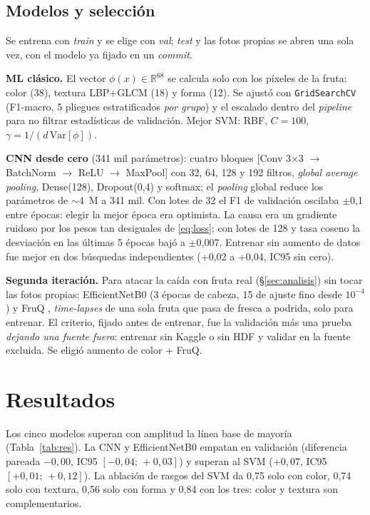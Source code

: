 \documentclass[conference,a4paper]{IEEEtran}
\begin{document}
\subsection{Modelos y selección}

Se entrena con \emph{train} y se elige con \emph{val}; \emph{test} y las fotos propias se abren una sola
vez, con el modelo ya fijado en un \emph{commit}.

\textbf{ML clásico.} El vector $\phi(x)\in\mathbb{R}^{68}$ se calcula solo con los píxeles de la fruta:
color (38), textura LBP+GLCM (18) y forma (12). Se ajustó con \texttt{GridSearchCV} (F1-macro, 5 pliegues
estratificados \emph{por grupo}) y el escalado dentro del \emph{pipeline} para no filtrar estadísticas
de validación. Mejor SVM: RBF, $C=100$, $\gamma=1/(d\,\mathrm{Var}[\phi])$.

\textbf{CNN desde cero} (341 mil parámetros): cuatro bloques [Conv 3$\times$3 $\rightarrow$ BatchNorm
$\rightarrow$ ReLU $\rightarrow$ MaxPool] con 32, 64, 128 y 192 filtros, \emph{global average pooling},
Dense(128), Dropout(0,4) y softmax; el \emph{pooling} global reduce los parámetros de $\sim$4~M a 341
mil. Con lotes de 32 el F1 de validación oscilaba $\pm$0,1 entre épocas: elegir la mejor época era
optimista. La causa era un gradiente ruidoso por los pesos tan desiguales de \eqref{eq:loss}; con
lotes de 128 y tasa coseno la desviación en las últimas 5 épocas bajó a $\pm$0,007. Entrenar sin
aumento de datos fue mejor en dos búsquedas independientes (+0,02 a +0,04, IC95 sin cero).

\textbf{Segunda iteración.} Para atacar la caída con fruta real (§\ref{sec:analisis}) sin tocar las fotos
propias: EfficientNetB0 \cite{tan2019} (3 épocas de cabeza, 15 de ajuste fino desde $10^{-4}$) y FruQ
\cite{abayomi2023}, \emph{time-lapses} de una sola fruta que pasa de fresca a podrida, solo para
entrenar. El criterio, fijado antes de entrenar, fue la validación más una prueba \emph{dejando una
fuente fuera}: entrenar sin Kaggle o sin HDF y validar en la fuente excluida. Se eligió aumento de
color + FruQ.

\section{Resultados}

Los cinco modelos superan con amplitud la línea base de mayoría (Tabla~\ref{tab:res}). La CNN y
EfficientNetB0 empatan en validación (diferencia pareada $-0{,}00$, IC95 $[-0{,}04;\,+0{,}03]$) y
superan al SVM ($+0{,}07$, IC95 $[+0{,}01;\,+0{,}12]$). La ablación de rasgos del SVM da 0,75 solo con
color, 0,74 solo con textura, 0,56 solo con forma y 0,84 con los tres: color y textura son
complementarios.
\end{document}
